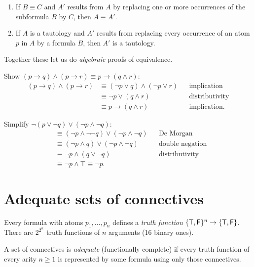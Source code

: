 \begin{theorem}
\begin{enumerate}
  \item If $B\equiv C$ and $A'$ results from $A$ by replacing one or more occurrences
        of the subformula $B$ by $C$, then $A\equiv A'$.
  \item If $A$ is a tautology and $A'$ results from replacing every occurrence of an atom
        $p$ in $A$ by a formula $B$, then $A'$ is a tautology.
\end{enumerate}
\end{theorem}

Together these let us do \emph{algebraic} proofs of equivalence.

\begin{example}
Show $(p\to q)\land(p\to r)\equiv p\to(q\land r)$:
\begin{align*}
(p\to q)\land(p\to r)
 &\equiv (\neg p\lor q)\land(\neg p\lor r) && \text{implication}\\
 &\equiv \neg p\lor(q\land r) && \text{distributivity}\\
 &\equiv p\to(q\land r) && \text{implication.}
\end{align*}
\end{example}

\begin{example}
Simplify $\neg(p\lor\neg q)\lor(\neg p\land\neg q)$:
\begin{align*}
 &\equiv (\neg p\land\neg\neg q)\lor(\neg p\land\neg q) && \text{De Morgan}\\
 &\equiv (\neg p\land q)\lor(\neg p\land\neg q) && \text{double negation}\\
 &\equiv \neg p\land(q\lor\neg q) && \text{distributivity}\\
 &\equiv \neg p\land\top \equiv \neg p. &&
\end{align*}
\end{example}

\section{Adequate sets of connectives}

Every formula with atoms $p_1,\dots,p_n$ defines a \emph{truth function}
$\{\mathsf{T},\mathsf{F}\}^n\to\{\mathsf{T},\mathsf{F}\}$. There are $2^{2^n}$ truth functions of $n$ arguments
(16 binary ones).

\begin{definition}
A set of connectives is \emph{adequate} (functionally complete) if every truth function
of every arity $n\ge 1$ is represented by some formula using only those connectives.
\end{definition}

